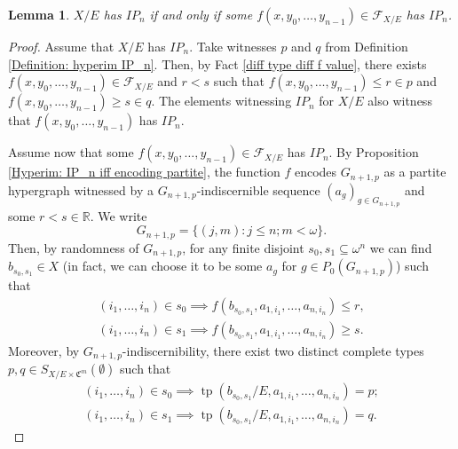 \documentclass{amsart}
\newtheorem{lema}[teor]{Lemma}
\newtheorem{external claim}[teor]{Claim}
\newcommand{\C}{{\mathfrak C}}
\newcommand{\R}{\mathbb{R}}
\DeclareMathOperator{\tp}{{tp}}
\begin{document}
\begin{lema}\label{IP_n hyperdef. set iif formulas}
    $X/E$ has $IP_n$ if and only if some $f(x,y_0,\dots,y_{n-1})\in \mathcal{F}_{X/E}$ has $IP_n$.
\end{lema}
\begin{proof}
    Assume that $X/E$ has $IP_n$. Take witnesses $p$ and $q$ from Definition \ref{Definition: hyperim IP_n}. Then, by Fact \ref{diff type diff f value}, there exists $f(x,y_0,\dots,y_{n-1})\in\mathcal{F}_{X/E}$ and $r<s$ such that $f(x,y_0,\dots,y_{n-1})\leq r \in p $ and $f(x,y_0,\dots,y_{n-1})\geq s \in q$. The elements witnessing $IP_n$ for $X/E$ also  witness that $f(x,y_0,\dots,y_{n-1})$ has $IP_n$.

 Assume now that some $f(x,y_0,\dots,y_{n-1})\in\mathcal{F}_{X/E}$ has $IP_n$. By Proposition \ref{Hyperim: IP_n iff encoding partite}, the function $f$ encodes $G_{n+1,p}$ as a partite hypergraph witnessed by a $G_{n+1,p}$-indiscernible sequence $(a_g)_{g\in G_{n+1,p}}$ and some $r<s\in \R$. We write $$G_{n+1,p}=\{ (j,m): j\leq n; m<\omega \}.$$ Then, by randomness of $G_{n+1,p}$, for any  finite disjoint $s_0,s_1\subseteq \omega^n$ we can find $b_{s_0,s_1}\in X$ (in fact, we can choose it to be some $a_g$ for $g\in P_0(G_{n+1,p})$) such that
    \begin{align*}
        (i_1,\dots, i_{n})\in s_0\implies f(b_{s_0,s_1}, a_{1,i_1},\dots, a_{n,i_{n}}  )\leq r,\\
       (i_1,\dots, i_{n})\in s_1 \implies f(b_{s_0,s_1}, a_{1,i_1},\dots, a_{n,i_{n}}  )\geq s .
    \end{align*}
    Moreover, by $G_{n+1,p}$-indiscernibility, there exist two distinct complete types $p,q\in S_{X/E\times \C^m}(\emptyset)$ such that %
    \begin{align*}
        (i_1,\dots, i_{n})\in s_0 \implies \tp(b_{s_0,s_1}/E, a_{1,i_1},\dots, a_{n,i_{n}}  )=p; \\
        (i_1,\dots, i_{n})\in s_1 \implies \tp(b_{s_0,s_1}/E, a_{1,i_1},\dots, a_{n,i_{n}}  )=q.
    \end{align*}

\end{proof}
\end{document}
